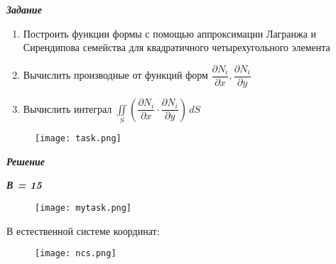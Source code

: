 \documentclass[a4paper, 12pt]{article}
\begin{document}
	\begin{center}
		\textbf{\textit{Задание}}
	\end{center}
	
	\begin{enumerate}
		\item Построить функции формы с помощью аппроксимации Лагранжа и Сирендипова семейства для квадратичного четырехугольного элемента 
		\item Вычислить производные от функций форм $\dfrac{\partial N_i}{\partial x}, \dfrac{\partial N_i}{\partial y}$
		\item Вычислить интеграл $ \iint\limits_S \left(\dfrac{\partial N_i}{\partial x}\cdot \dfrac{\partial N_i}{\partial y}\right)\, dS$
	\end{enumerate}
	\begin{figure}[H]
		\centering
		\texttt{[image: task.png]}
	\end{figure}

	\begin{center}
		\textbf{\textit{Решение}}
		
		\textit{\textbf{В = 15}}
	\end{center}
	\begin{figure}[H]
		\centering
		\texttt{[image: mytask.png]}
	\end{figure}
	
	В естественной системе координат:
	\begin{figure}[H]
		\centering
		\texttt{[image: ncs.png]}
	\end{figure}
	
\end{document}

